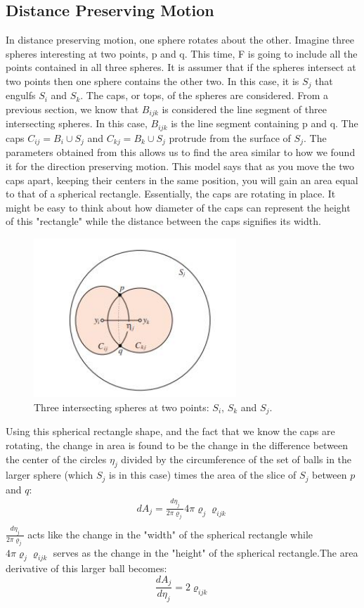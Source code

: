 \documentclass{article}
\begin{document}
\subsection{Distance Preserving Motion}
In distance preserving motion, one sphere rotates about the other. Imagine three spheres interesting at two points, p and q. This time, F is going to include all the points contained in all three spheres. It is assumer that if the spheres intersect at two points then one sphere contains the other two. In this case, it is $S_j$ that engulfs $S_i$ and $S_k$. The caps, or tops, of the spheres are considered. From a previous section, we know that $B_{ijk}$ is considered the line segment of three intersecting spheres. In this case, $B_{ijk}$ is the line segment containing p and q. The caps $C_{ij} = B_i \cup S_j$ and $C_{kj} = B_k \cup S_j$ protrude from the surface of $S_j$. The parameters obtained from this allows us to find the area similar to how we found it for the direction preserving motion. This model says that as you move the two caps apart, keeping their centers in the same position, you will gain an area equal to that of a spherical rectangle. Essentially, the caps are rotating in place. It might be easy to think about how diameter of the caps can represent the height of this "rectangle" while the distance between the caps signifies its width.
\begin{figure}[h!]
\caption{Three intersecting spheres at two points: $S_i$, $S_k$ and $S_j$.}
\centerline{\includegraphics[width=3in]{Figure7}}
\end{figure}

Using this spherical rectangle shape, and the fact that we know the caps are rotating, the change in area is found to be the change in the difference between the center of the circles $\eta_j$ divided by the circumference of the set of balls in the larger sphere (which $S_j$ is in this case) times the area of the slice of $S_j$ between $p$ and $q$: 
\begin{align}
dA_j = \frac{d\eta_j}{2\pi\varrho_j}4\pi\varrho_j\varrho_{ijk}\\
\end{align}
$\frac{d\eta_j}{2\pi\varrho_j}$ acts like the change in the "width" of the spherical rectangle while $4\pi\varrho_j\varrho_{ijk}$ serves as the change in the "height" of the spherical rectangle.The area derivative of this larger ball becomes:
\begin{equation*}
\frac{dA_j}{d\eta_j }= 2\varrho_{ijk}
\end{equation*}
\end{document}
